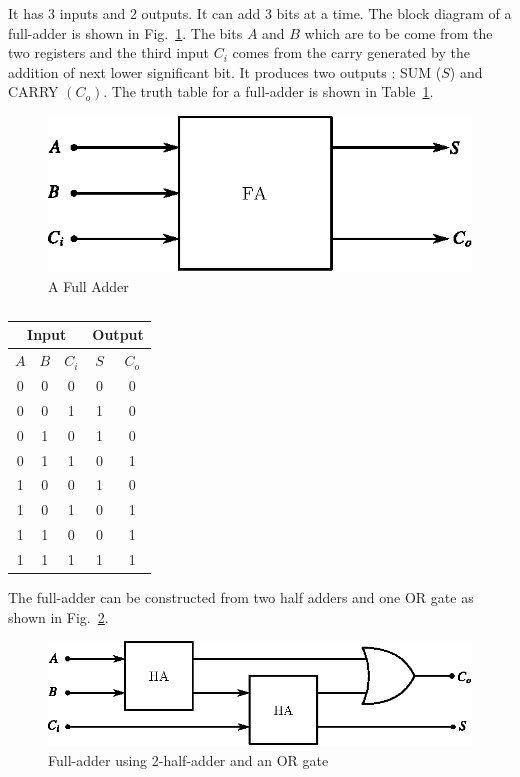 It has 3 inputs and 2 outputs. It can add 3 bits at a time. The block diagram of a full-adder is shown in Fig.~\ref{fig5.26}. The bits $A$ and $B$ which are to be come from the two registers and the third input $C_{i}$ comes from the carry generated by the addition of next lower significant bit. It produces two outputs : SUM ($S$) and CARRY $(C_{o})$. The truth table for a full-adder is shown in Table~\ref{tab5.17}.
\begin{figure}[H]
\centering
\includegraphics{chap5/fig5.19.eps}
\caption{A Full Adder}\label{fig5.26}
\end{figure}
\begin{table}[H]
\centering
\caption{}\label{tab5.17}
\tabcolsep=8pt
\renewcommand{\arraystretch}{1.2}
\begin{tabular}{|ccc|cc|}
\hline
\multicolumn{3}{|c|}{\bf Input} & \multicolumn{2}{c|}{\bf Output}\\
\hline
\boldmath$A$ & \boldmath$B$ & \boldmath$C_{i}$ & \boldmath$S$ & \boldmath$C_{o}$\\
\hline
0 & 0 & 0 & 0 & 0\\
0 & 0 & 1 & 1 & 0\\
0 & 1 & 0 & 1 & 0\\
0 & 1 & 1 & 0 & 1\\
1 & 0 & 0 & 1 & 0\\
1 & 0 & 1 & 0 & 1\\
1 & 1 & 0 & 0 & 1\\
1 & 1 & 1 & 1 & 1\\
\hline
\end{tabular}
\end{table}

The full-adder can be constructed from two half adders and one OR gate as shown in Fig.~\ref{fig5.27}.
\begin{figure}[H]
\centering
\includegraphics{chap5/fig5.20.eps}
\caption{Full-adder using 2-half-adder and an OR gate}\label{fig5.27}
\end{figure}

